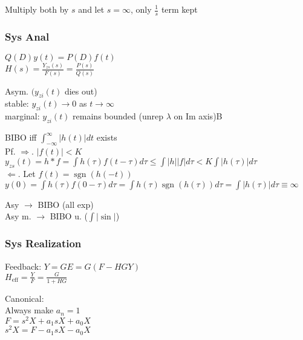 \documentclass[4pt]{article}
\theoremstyle{definition}
\theoremstyle{definition}
\newcommand{\ra}{\rightarrow}
\DeclareMathOperator{\sgn}{sgn}
\begin{document}
\begin{multicols}{3}
    Multiply both by $s$ and let $s=\infty$, only $\frac{1}{s}$ term kept 

\subsubsection{Sys Anal}
    \(Q(D) y(t) = P(D) f(t)\)\\
    $H(s) = \frac{Y_{zs}(s)}{F(s)} = \frac{P(s)}{Q(s)}$  %

    Asym. $(y_{zi} (t)$ dies out)\\         %
    stable: $y_{zi}(t) \ra 0$ as $t\ra \infty$\\
    marginal: $y_{zi}(t)$ remains bounded (unrep $\lambda$ on Im axis)B

    BIBO iff \(\int_{-\infty}^{\infty} |h(t)| dt\) exists\\ %
    Pf. $\Rightarrow$. $|f(t)| < K$\\                       %
    \(y_{zs}(t) = h * f = \int h(\tau) f(t-\tau) d\tau \leq \int |h||f| d\tau < K \int |h(\tau)| d\tau\)\\
    $\Leftarrow$. Let $f(t) = \sgn(h(-t))$\\                %
    \(y(0) = \int h(\tau) f(0-\tau) d\tau = \int h(\tau) \sgn(h(\tau)) d\tau  = \int |h(\tau)| d\tau \equiv \infty\)

    Asy $\rightarrow$ BIBO (all exp)\\                                %
    Asy m. $\rightarrow$ BIBO u. ($\int |\sin|$)                            %

\subsubsection{Sys Realization}         %
    Feedback: \(Y = GE = G(F - HGY)\)\\
    \(H_{\text{eff}} = \frac{Y} F = \frac G {1+HG}\)

    Canonical:\\              %
    Always make $a_n = 1$\\
    \(F = s^2 X + a_1 sX + a_0 X\)\\
    \(s^2 X = F - a_1 sX - a_0 X\)      %


\end{multicols}
\end{document}
